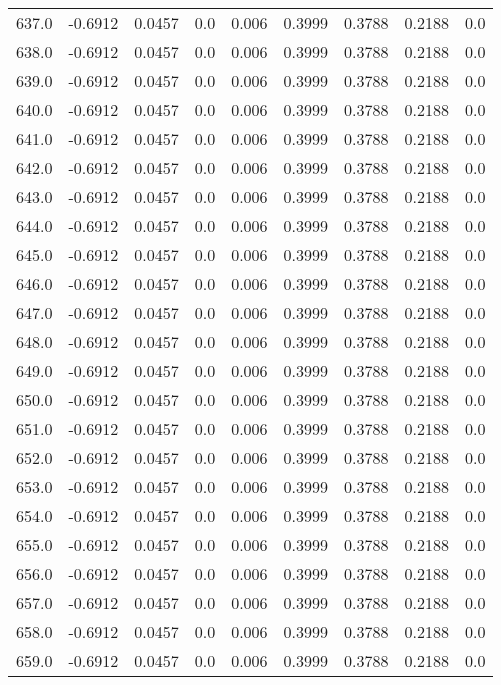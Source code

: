 \begin{longtable}{lrrrrrrrr}
637.0 & -0.6912 & 0.0457 & 0.0 & 0.006 & 0.3999 & 0.3788 & 0.2188 & 0.0 \\
638.0 & -0.6912 & 0.0457 & 0.0 & 0.006 & 0.3999 & 0.3788 & 0.2188 & 0.0 \\
639.0 & -0.6912 & 0.0457 & 0.0 & 0.006 & 0.3999 & 0.3788 & 0.2188 & 0.0 \\
640.0 & -0.6912 & 0.0457 & 0.0 & 0.006 & 0.3999 & 0.3788 & 0.2188 & 0.0 \\
641.0 & -0.6912 & 0.0457 & 0.0 & 0.006 & 0.3999 & 0.3788 & 0.2188 & 0.0 \\
642.0 & -0.6912 & 0.0457 & 0.0 & 0.006 & 0.3999 & 0.3788 & 0.2188 & 0.0 \\
643.0 & -0.6912 & 0.0457 & 0.0 & 0.006 & 0.3999 & 0.3788 & 0.2188 & 0.0 \\
644.0 & -0.6912 & 0.0457 & 0.0 & 0.006 & 0.3999 & 0.3788 & 0.2188 & 0.0 \\
645.0 & -0.6912 & 0.0457 & 0.0 & 0.006 & 0.3999 & 0.3788 & 0.2188 & 0.0 \\
646.0 & -0.6912 & 0.0457 & 0.0 & 0.006 & 0.3999 & 0.3788 & 0.2188 & 0.0 \\
647.0 & -0.6912 & 0.0457 & 0.0 & 0.006 & 0.3999 & 0.3788 & 0.2188 & 0.0 \\
648.0 & -0.6912 & 0.0457 & 0.0 & 0.006 & 0.3999 & 0.3788 & 0.2188 & 0.0 \\
649.0 & -0.6912 & 0.0457 & 0.0 & 0.006 & 0.3999 & 0.3788 & 0.2188 & 0.0 \\
650.0 & -0.6912 & 0.0457 & 0.0 & 0.006 & 0.3999 & 0.3788 & 0.2188 & 0.0 \\
651.0 & -0.6912 & 0.0457 & 0.0 & 0.006 & 0.3999 & 0.3788 & 0.2188 & 0.0 \\
652.0 & -0.6912 & 0.0457 & 0.0 & 0.006 & 0.3999 & 0.3788 & 0.2188 & 0.0 \\
653.0 & -0.6912 & 0.0457 & 0.0 & 0.006 & 0.3999 & 0.3788 & 0.2188 & 0.0 \\
654.0 & -0.6912 & 0.0457 & 0.0 & 0.006 & 0.3999 & 0.3788 & 0.2188 & 0.0 \\
655.0 & -0.6912 & 0.0457 & 0.0 & 0.006 & 0.3999 & 0.3788 & 0.2188 & 0.0 \\
656.0 & -0.6912 & 0.0457 & 0.0 & 0.006 & 0.3999 & 0.3788 & 0.2188 & 0.0 \\
657.0 & -0.6912 & 0.0457 & 0.0 & 0.006 & 0.3999 & 0.3788 & 0.2188 & 0.0 \\
658.0 & -0.6912 & 0.0457 & 0.0 & 0.006 & 0.3999 & 0.3788 & 0.2188 & 0.0 \\
659.0 & -0.6912 & 0.0457 & 0.0 & 0.006 & 0.3999 & 0.3788 & 0.2188 & 0.0 \\

\end{longtable}
